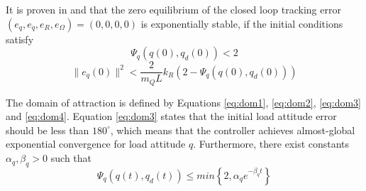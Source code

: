 It is proven in \cite{Sreenath2013c} and \cite[Lemma 11.23]{Bullo2005} that the zero equilibrium of the closed loop tracking error $ (e_q,e_{\dot{q}},e_R,e_\Omega)=(0,0,0,0) $ is exponentially stable, if the initial conditions satisfy
\begin{equation}\label{eq:dom3}
\Psi_q(q(0),q_d(0))<2
\end{equation}
\begin{equation}\label{eq:dom4}
\parallel e_{\dot{q}}(0)\parallel^2<\frac{2}{m_QL}{k_R}(2-\Psi_q(q(0),q_d(0)))
\end{equation}

The domain of attraction is defined by Equations \ref{eq:dom1}, \ref{eq:dom2}, \ref{eq:dom3} and \ref{eq:dom4}. Equation \ref{eq:dom3} states that the initial load attitude error should be less than $ 180^\circ $, which means that the controller achieves almost-global exponential convergence for load attitude $ q $.
Furthermore, there exist constants $ \alpha_q,\beta_q>0 $ such that
\begin{equation}\label{eq:con.proofPsiq}
\Psi_q(q(t),q_d(t)) \leq min\left\lbrace 2,\alpha_qe^{-\beta_qt}\right\rbrace 
\end{equation}

